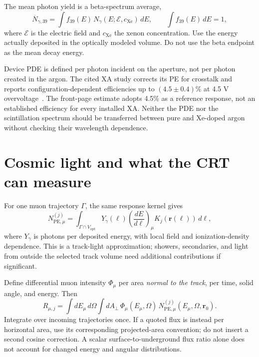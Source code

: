 \documentclass[11pt]{article}
\begin{document}
The mean photon yield is a beta-spectrum average,
\begin{equation}
\overline N_{\gamma,39}
=\int f_{39}(E)\,N_\gamma(E;\mathcal E,c_{\mathrm{Xe}})\,dE,
\qquad \int f_{39}(E)\,dE=1,
\end{equation}
where $\mathcal E$ is the electric field and $c_{\mathrm{Xe}}$ the xenon
concentration. Use the energy actually deposited in the optically modeled
volume. Do not use the beta endpoint as the mean decay energy.

Device PDE is defined per photon incident on the aperture, not per photon
created in the argon. The cited XA study corrects its PE for crosstalk and
reports configuration-dependent efficiencies up to $(4.5\pm0.4)\%$ at
4.5 V overvoltage~\cite{fdvd_pde}. The front-page estimate adopts 4.5\%
as a reference response, not an established efficiency for every installed XA.
Neither the PDE nor the scintillation spectrum should be transferred between
pure and Xe-doped argon without checking their wavelength dependence.

\section{Cosmic light and what the CRT can measure}

For one muon trajectory $\Gamma$, the same response kernel gives
\begin{equation}
N_{\mathrm{PE},\mu}^{(j)}
=\int_{\Gamma\cap V_{\mathrm{opt}}}
Y_\gamma(\ell)\left(\frac{dE}{d\ell}\right)_\mu
K_j(\bm r(\ell))\,d\ell,
\label{eq:muPE}
\end{equation}
where $Y_\gamma$ is photons per deposited energy, with local field and
ionization-density dependence. This is a track-light approximation;
showers, secondaries, and light from outside the selected track volume need
additional contributions if significant.

Define differential muon intensity $\Phi_\mu$ per area \emph{normal to the
track}, per time, solid angle, and energy. Then
\begin{equation}
R_{\mu,j}=\int dE_\mu\,d\Omega\int dA_\perp\,
\Phi_\mu(E_\mu,\Omega)\,
N_{\mathrm{PE},\mu}^{(j)}(E_\mu,\Omega,\bm r_0).
\label{eq:muRate}
\end{equation}
Integrate over incoming trajectories once. If a quoted flux is instead per
horizontal area, use its corresponding projected-area convention; do not
insert a second cosine correction. A scalar surface-to-underground flux
ratio alone does not account for changed energy and angular distributions.
\end{document}
